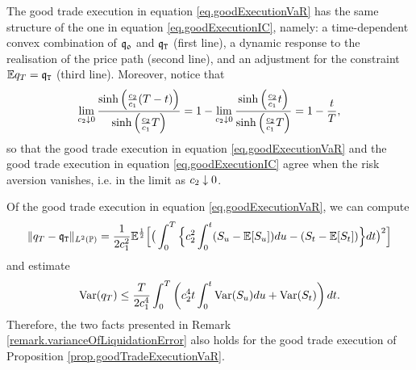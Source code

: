 \documentclass[10pt,a4paper]{article}
\begin{document}
\begin{remark}
The good trade execution in equation \eqref{eq.goodExecutionVaR} has the same structure of the one in equation \eqref{eq.goodExecutionIC}, namely: a time-dependent convex combination of $\mathfrak{q_0}$ and $\mathfrak{q}_{\mathtt{T} }$ (first line), a dynamic response to the realisation of the price path (second line), and an adjustment for the constraint $\mathbb{{E}}q_T = \mathfrak{q}_{\mathtt{T} }$ (third line). Moreover, notice that 
\begin{equation*}
\lim_{c_{2}\downarrow 0}
\frac{\sinh\left(\frac{c_{2}}{c_{1}} (T - t)\right)}{\sinh\left(\frac{c_{2}}{c_{1}} T \right)}
= 1 - 	\lim_{c_{2}\downarrow 0}
\frac{\sinh\left(\frac{c_{2}}{c_{1}}  t\right)}{\sinh\left(\frac{c_{2}}{c_{1}} T \right)}
= 1- \frac{t}{T},
\end{equation*} 
so that the good trade execution in equation \eqref{eq.goodExecutionVaR} and the good trade execution in equation \eqref{eq.goodExecutionIC} agree when the risk aversion vanishes, i.e. in the limit as $c_{2}\downarrow 0$. 
\end{remark}

\begin{remark}
Of the good trade execution in equation \eqref{eq.goodExecutionVaR}, we can compute 
\begin{equation*}
\lVert q_T - \mathfrak{q}_{\mathtt{T} } \rVert_{L^{2}({\mathbb{P}})}
= \frac{1}{2c_{1}^{2}} 
\mathbb{{E}}^{\frac{1}{2}} \Big[
\big(
\int_{0}^{T}
	\Big\lbrace
		c_{2}^{2} \int_{0}^{t} (S_u - \mathbb{{E}}[S_u])du 
		-  (S_t - \mathbb{{E}}[S_t])
	\Big\rbrace dt 
\big)^{2} 
\Big]
\end{equation*}
and estimate 
\begin{equation*}
\mathrm{Var}(q_T) \leq 
\frac{T}{2c_{1}^{4}} \int_{0}^{T}
\left(
c_{2}^{4} t \int_{0}^{t} \mathrm{Var}(S_u)du + \mathrm{Var}(S_t)
\right)dt.
\end{equation*}
Therefore, the two facts presented in Remark \ref{remark.varianceOfLiquidationError} also holds for the good trade execution of Proposition \ref{prop.goodTradeExecutionVaR}.
\end{remark}
\end{document}
